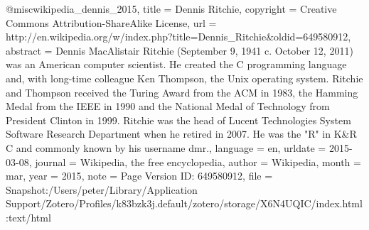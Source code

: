 {@misc{wikipedia_dennis_2015,
	title = {Dennis {Ritchie}},
	copyright = {Creative Commons Attribution-ShareAlike License},
	url = {http://en.wikipedia.org/w/index.php?title=Dennis_Ritchie&oldid=649580912},
	abstract = {Dennis MacAlistair Ritchie (September 9, 1941 {\textendash} c. October 12, 2011) was an American computer scientist. He created the C programming language and, with long-time colleague Ken Thompson, the Unix operating system. Ritchie and Thompson received the Turing Award from the ACM in 1983, the Hamming Medal from the IEEE in 1990 and the National Medal of Technology from President Clinton in 1999. Ritchie was the head of Lucent Technologies System Software Research Department when he retired in 2007. He was the "R" in K\&R C and commonly known by his username dmr.},
	language = {en},
	urldate = {2015-03-08},
	journal = {Wikipedia, the free encyclopedia},
	author = {{Wikipedia}},
	month = mar,
	year = {2015},
	note = {Page Version ID: 649580912},
	file = {Snapshot:/Users/peter/Library/Application Support/Zotero/Profiles/k83bzk3j.default/zotero/storage/X6N4UQIC/index.html:text/html}
}

}
